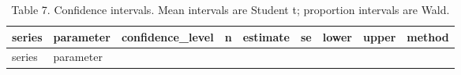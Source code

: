 \documentclass[
]{article}
\begin{document}
\begin{longtable}[]{@{}
  >{\raggedright\arraybackslash}p{}
  >{\raggedright\arraybackslash}p{}
  >{\raggedleft\arraybackslash}p{}
  >{\raggedleft\arraybackslash}p{}
  >{\raggedleft\arraybackslash}p{}
  >{\raggedleft\arraybackslash}p{}
  >{\raggedleft\arraybackslash}p{}
  >{\raggedleft\arraybackslash}p{}
  >{\raggedright\arraybackslash}p{}@{}}
\caption{Table 7. Confidence intervals. Mean intervals are Student t;
proportion intervals are Wald.}\tabularnewline
\toprule\noalign{}
\begin{minipage}[b]{\linewidth}\raggedright
series
\end{minipage} & \begin{minipage}[b]{\linewidth}\raggedright
parameter
\end{minipage} & \begin{minipage}[b]{\linewidth}\raggedleft
confidence\_level
\end{minipage} & \begin{minipage}[b]{\linewidth}\raggedleft
n
\end{minipage} & \begin{minipage}[b]{\linewidth}\raggedleft
estimate
\end{minipage} & \begin{minipage}[b]{\linewidth}\raggedleft
se
\end{minipage} & \begin{minipage}[b]{\linewidth}\raggedleft
lower
\end{minipage} & \begin{minipage}[b]{\linewidth}\raggedleft
upper
\end{minipage} & \begin{minipage}[b]{\linewidth}\raggedright
method
\end{minipage} \\
\midrule\noalign{}
\endfirsthead
\toprule\noalign{}
\begin{minipage}[b]{\linewidth}\raggedright
series
\end{minipage} & \begin{minipage}[b]{\linewidth}\raggedright
parameter
\end{minipage} & \begin{minipage}[b]{\linewidth}\raggedleft

\end{minipage}
\end{longtable}
\end{document}
